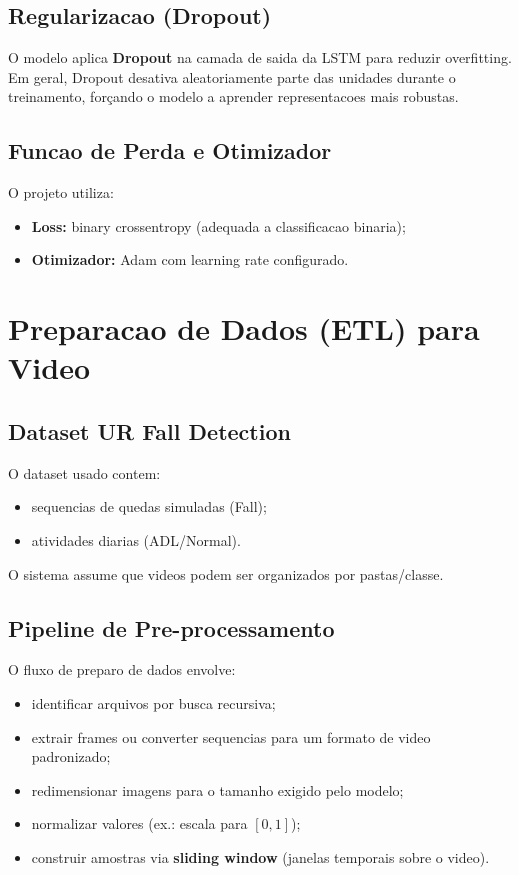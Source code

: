\subsection{Regularizacao (Dropout)}
O modelo aplica \textbf{Dropout} na camada de saida da LSTM para reduzir overfitting. Em geral, Dropout desativa aleatoriamente parte das unidades durante o treinamento, forçando o modelo a aprender representacoes mais robustas.

\subsection{Funcao de Perda e Otimizador}
O projeto utiliza:
\begin{itemize}
  \item \textbf{Loss:} binary crossentropy (adequada a classificacao binaria);
  \item \textbf{Otimizador:} Adam com learning rate configurado.
\end{itemize}

\section{Preparacao de Dados (ETL) para Video}

\subsection{Dataset UR Fall Detection}
O dataset usado contem:
\begin{itemize}
  \item sequencias de quedas simuladas (Fall);
  \item atividades diarias (ADL/Normal).
\end{itemize}
O sistema assume que videos podem ser organizados por pastas/classe.

\subsection{Pipeline de Pre-processamento}
O fluxo de preparo de dados envolve:
\begin{itemize}
  \item identificar arquivos por busca recursiva;
  \item extrair frames ou converter sequencias para um formato de video padronizado;
  \item redimensionar imagens para o tamanho exigido pelo modelo;
  \item normalizar valores (ex.: escala para $[0,1]$);
  \item construir amostras via \textbf{sliding window} (janelas temporais sobre o video).
\end{itemize}

